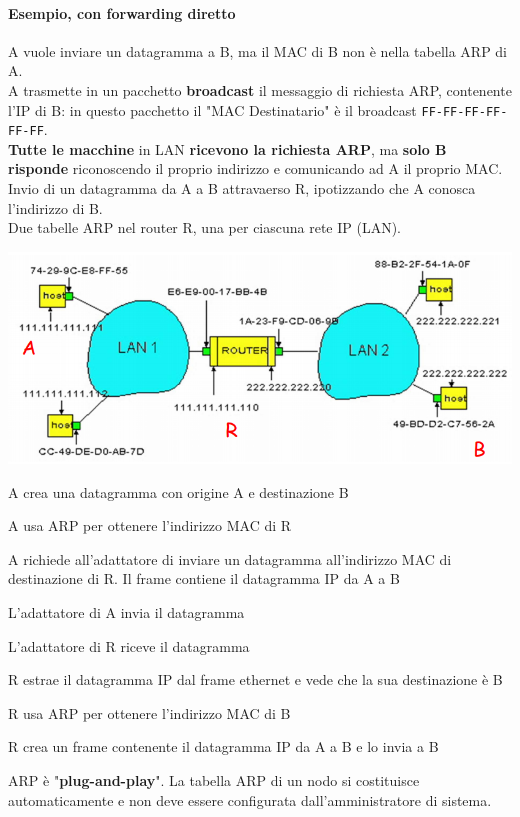 \documentclass[10pt]{article}
\begin{document}
\paragraph{Esempio, con forwarding diretto} A vuole inviare un datagramma a B, ma il MAC di B non è nella tabella ARP di A.\\
A trasmette in un pacchetto \textbf{broadcast} il messaggio di richiesta ARP, contenente l'IP di B: in questo pacchetto il "MAC Destinatario" è il broadcast \texttt{FF-FF-FF-FF-FF-FF}.\\
\textbf{Tutte le macchine} in LAN \textbf{ricevono la richiesta ARP}, ma \textbf{solo B risponde} riconoscendo il proprio indirizzo e comunicando ad A il proprio MAC.\\
\pagebreak
Invio di un datagramma da A a B attravaerso R, ipotizzando che A conosca l'indirizzo di B.\\Due tabelle ARP nel router R, una per ciascuna rete IP (LAN).
\begin{center}
	\includegraphics[scale=0.7]{esarpfordiretto.png}
\end{center}
\begin{list}{}{}
	\item A crea una datagramma con origine A e destinazione B
	\item A usa ARP per ottenere l'indirizzo MAC di R
	\item A richiede all'adattatore di inviare un datagramma all'indirizzo MAC di destinazione di R. Il frame contiene il datagramma IP da A a B
	\item L'adattatore di A invia il datagramma
	\item L'adattatore di R riceve il datagramma
	\item R estrae il datagramma IP dal frame ethernet e vede che la sua destinazione è B
	\item R usa ARP per ottenere l'indirizzo MAC di B
	\item R crea un frame contenente il datagramma IP da A a B e lo invia a B
\end{list}
ARP è "\textbf{plug-and-play}". La tabella ARP di un nodo si costituisce automaticamente e non deve essere configurata dall'amministratore di sistema.
\pagebreak
\end{document}
